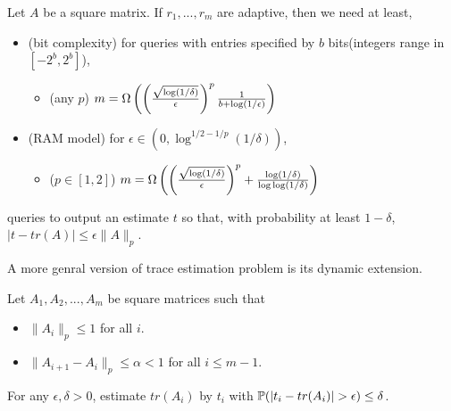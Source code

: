 \begin{thm}
\label{tr_est_nada_schatten_p}
Let $A$ be a square matrix. If $r_1,...,r_m$ are adaptive,
then we need at least, 
\begin{itemize}
    \item (bit complexity) for queries with entries specified by $b$ bits(integers range in $[-2^b,2^b]$),
    \begin{itemize}
        \item (any $p$) $m=\Omega\left(\left(\frac{\sqrt{\log(1/\delta)}}{\epsilon}\right)^p\frac{1}{b+\log(1/\epsilon)}\right)$ 
    \end{itemize}
    \item (RAM model) for $\epsilon\in(0,\log^{1/2-1/p}(1/\delta))$,
    \begin{itemize}
        \item ($p\in[1,2]$) $m=\Omega\left(\left(\frac{\sqrt{\log(1/\delta)}}{\epsilon}\right)^p+\frac{\log(1/\delta)}{\log\log(1/\delta)}\right)$ 
    \end{itemize}
\end{itemize}
queries  to output an estimate $t$ so that, with probability at least $1-\delta$, $|t-tr(A)|\le \epsilon \|A\|_p$. 
\end{thm}

A more genral version of trace estimation problem is its dynamic extension.
\begin{prob}
\label{tr_est_dynamic_prob}
Let $A_1,A_2,...,A_m$ be square matrices such that
\begin{itemize}
    \item $\|A_i\|_p\le 1$ for all $i$.
    \item $\|A_{i+1}-A_i\|_p\le\alpha<1$ for all $i\le m-1$.
\end{itemize}
For any $\epsilon,\delta>0$, estimate $tr(A_i)$ by $t_i$ with $\mb P(|t_i-tr(A_i)|>\epsilon)\le\delta$.
\end{prob}

